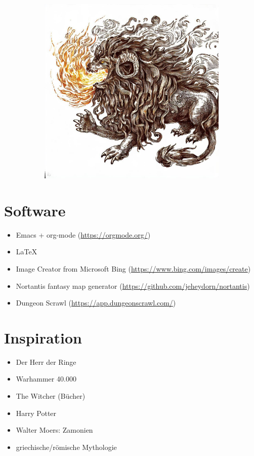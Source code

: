\documentclass[11pt, twoside]{article}
\begin{document}
\begin{figure}[H]
\begin{subfigure}{0.3\textwidth}
  \end{subfigure}%
  \begin{subfigure}{0.3\textwidth}
    \centering
    \includegraphics[width=0.99\linewidth]{chim3.jpeg}
  \end{subfigure}
\end{figure}

\newpage
\appendix
\listoffigures
\newpage

\section{Software}
\label{sec:org91922c4}
\begin{itemize}
\item Emacs + org-mode (\href{https://orgmode.org/}{https://orgmode.org/})
\item \LaTeX
\item Image Creator from Microsoft Bing (\href{https://www.bing.com/images/create}{https://www.bing.com/images/create})
\item Nortantis fantasy map generator (\href{https://github.com/jeheydorn/nortantis}{https://github.com/jeheydorn/nortantis})
\item Dungeon Scrawl (\href{https://app.dungeonscrawl.com/}{https://app.dungeonscrawl.com/})
\end{itemize}

\section{Inspiration}
\label{sec:org6d602f0}
\begin{itemize}
\item Der Herr der Ringe
\item Warhammer 40.000
\item The Witcher (Bücher)
\item Harry Potter
\item Walter Moers: Zamonien
\item griechische/römische Mythologie
\end{itemize}
\end{document}
